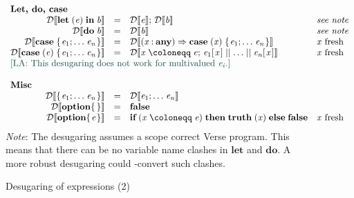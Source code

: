 \documentclass[acmsmall,screen]{acmart}\settopmatter{}
\newcommand{\Varid}[1]{\mathit{#1}}
\newcommand{\De}[1]{{\mathcal D}\llbracket #1 \rrbracket}
\newcommand{\De}[1]{#1}
\newcommand{\coloredtext}[3]{\strut\ifmmode\text{\color{#1} [{#2}: #3]}\else{\color{#1} [{#2}: #3]}\fi}
\newcommand{\lennart}{\coloredtext{dkcyan}{LA}}
\newenvironment{figurebox}{\begin{figure}\begin{framed}}{\end{framed}\end{figure}}
\begin{document}
\begin{figurebox}
$$\begin{array}{rcll}
  \\
  \multicolumn{1}{l}{\textbf{Let, do, case}} \\
  \ensuremath{\De{ \mathbf{let}\;(\Varid{e})\;\textbf{in}\;\Varid{b}}} & = & \ensuremath{\De{ \Varid{e}};\,\De{ \Varid{b}}} & \textit{see note} \\
  \ensuremath{\De{ \textbf{do}\;\Varid{b}}} & = & \ensuremath{\De{ \Varid{b}}} & \textit{see note}  \\
  \ensuremath{\De{ \textbf{case}\;\{\mskip1.5mu \Varid{e}_{\mathrm{1}};\,\!\ldots\!\;\Varid{e}_{\Varid{n}}\mskip1.5mu\}}} & = & \ensuremath{\De{ (\Varid{x}\mathbin{:}\textbf{any})\Rightarrow \textbf{case}\;(\Varid{x})\;\{\mskip1.5mu \Varid{e}_{\mathrm{1}};\,\!\ldots\!\;\Varid{e}_{\Varid{n}}\mskip1.5mu\}}} & \text{\ensuremath{\Varid{x}} fresh} \\
  \ensuremath{\De{ \textbf{case}\;(\Varid{e})\;\{\mskip1.5mu \Varid{e}_{\mathrm{1}};\,\!\ldots\!\;\Varid{e}_{\Varid{n}}\mskip1.5mu\}}} & = & \ensuremath{\De{ \Varid{x}\mathrel{\coloneqq}\Varid{e};\,\Varid{e}_{\mathrm{1}} [\mskip1.5mu \Varid{x}\mskip1.5mu]\;||\;\!\ldots\!\;||\;\Varid{e}_{\Varid{n}} [\mskip1.5mu \Varid{x}\mskip1.5mu]}} & \text{\ensuremath{\Varid{x}} fresh} \\
  \multicolumn{4}{l}{\lennart{This desugaring does not work for multivalued \ensuremath{\Varid{e}_{\Varid{i}}}.}} \\
  \\
  \multicolumn{1}{l}{\textbf{Misc}} \\
  \ensuremath{\De{ \{\mskip1.5mu \Varid{e}_{\mathrm{1}};\,\!\ldots\!\;\Varid{e}_{\Varid{n}}\mskip1.5mu\}}} & = & \ensuremath{\De{ \Varid{e}_{\mathrm{1}};\,\!\ldots\!\;\Varid{e}_{\Varid{n}}}} \\
  \ensuremath{\De{ \textbf{option} \{\mskip1.5mu \mskip1.5mu\}}} & = & \ensuremath{\textbf{false}} \\
  \ensuremath{\De{ \textbf{option} \{\mskip1.5mu \Varid{e}\mskip1.5mu\}}} & = & \ensuremath{\textbf{if}\;(\Varid{x}\mathrel{\coloneqq}\Varid{e})\;\textbf{then}\;\textbf{truth}\;(\Varid{x})\;\textbf{else}\;\textbf{false}} & \text{\ensuremath{\Varid{x}} fresh} \\
\end{array}
$$
{\em Note}: The desugaring assumes a scope correct Verse program.
This means that there can be no variable name clashes in \ensuremath{\mathbf{let}} and \ensuremath{\textbf{do}}.
A more robust desugaring could \textalpha-convert such clashes.
\caption{Desugaring of expressions (2)} \label{fig:desugar-expr2}
\end{figurebox}
\end{document}
